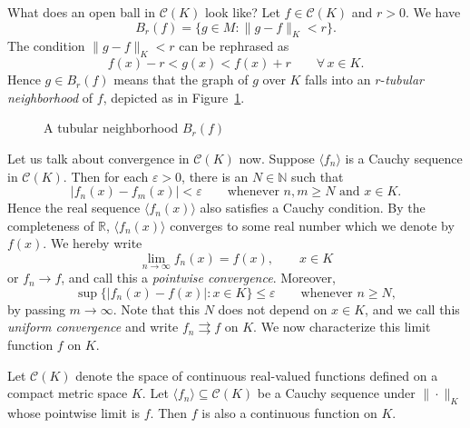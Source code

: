 What does an open ball in $\mathcal{C}(K)$ look like?
Let $f \in \mathcal{C}(K)$ and $r > 0$.  We have
\[
  B_r(f) = \{ g \in M \colon \| g - f \|_K < r \}.
\]
The condition $\|g-f\|_K < r$ can be rephrased as
\[
  f(x) - r < g(x) < f(x) + r \qquad \forall\, x \in K.
\]
Hence $g \in B_r(f)$ means that the graph of $g$ over $K$ falls into an $r$-\textit{tubular neighborhood} of $f$, depicted as in Figure~\ref{fig:tubular}.

\begin{figure}
  \centering
  \caption{A tubular neighborhood $B_r(f)$}
  \label{fig:tubular}
\end{figure}

Let us talk about convergence in $\mathcal{C}(K)$ now.
Suppose $\langle f_n \rangle$ is a Cauchy sequence in $\mathcal{C}(K)$.
Then for each $\varepsilon > 0$, there is an $N \in \mathbb{N}$ such that
\[
  \tag{2}
  |f_n(x) - f_m(x)| < \varepsilon \qquad \text{whenever $n,m \geqslant N$ and $x \in K$.}
\]
Hence the real sequence $\langle f_n(x) \rangle$ also satisfies a Cauchy condition.
By the completeness of $\mathbb{R}$, $\langle f_n(x) \rangle$ converges to some real number which we denote by $f(x)$.
We hereby write
\[
  \lim_{n \to \infty} f_n(x) = f(x), \qquad x \in K
\]
or $f_n \to f$, and call this a \textit{pointwise convergence}.
Moreover, 
\[
  \tag{3}
  \sup \{ |f_n(x) - f(x)| \colon x \in K \} \leqslant \varepsilon \qquad
  \text{whenever $n \geqslant N$},
\]
by passing $m \to \infty$.  Note that this $N$ does not depend on $x \in K$, and we call this \textit{uniform convergence} and write $f_n \rightrightarrows f$ on $K$.
We now characterize this limit function $f$ on $K$.

\begin{thm}
  \label{thm:CK-complete}
  Let $\mathcal{C}(K)$ denote the space of continuous real-valued functions defined on a compact metric space $K$.
  Let $\langle f_n \rangle \subseteq \mathcal{C}(K)$ be a Cauchy sequence under $\| \cdot \|_K$ whose pointwise limit is $f$.
  Then $f$ is also a continuous function on $K$.
\end{thm}

